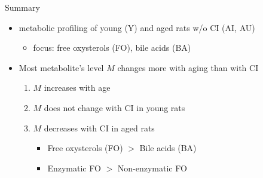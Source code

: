 \documentclass[aspectratio=169]{beamer}
\begin{document}
\begin{frame}{Summary}
  \begin{itemize}
    \item<1-> metabolic profiling of young (Y) and aged rats w/o CI (AI, AU)
      \begin{itemize}
        \item focus: free oxysterols (FO), bile acids (BA)
      \end{itemize}
    \item<2-> Most metabolite's level $M$ changes more with aging than with
      CI\\
      \begin{enumerate}
        \item $M$ increases with age
        \item $M$ does not change with CI in young rats
        \item $M$ decreases with CI in aged rats
      \begin{itemize}
        \item Free oxysterols (FO) $>$ Bile acids (BA)
        \item Enzymatic FO $>$ Non-enzymatic FO
      \end{itemize}
      \end{enumerate}
  \end{itemize}
\end{frame}
\end{document}
